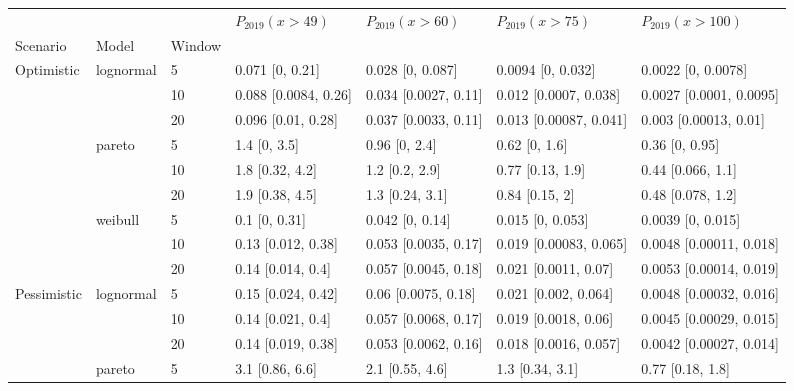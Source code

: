 \begin{tabular}{lllllll}
\toprule
           &         &    &      $P_{2019}(x>49)$ &      $P_{2019}(x>60)$ &        $P_{2019}(x>75)$ &        $P_{2019}(x>100)$ \\
Scenario & Model & Window &                       &                       &                         &                          \\
\midrule
Optimistic & lognormal & 5  &       0.071 [0, 0.21] &      0.028 [0, 0.087] &       0.0094 [0, 0.032] &       0.0022 [0, 0.0078] \\
           &         & 10 &  0.088 [0.0084, 0.26] &  0.034 [0.0027, 0.11] &   0.012 [0.0007, 0.038] &  0.0027 [0.0001, 0.0095] \\
           &         & 20 &    0.096 [0.01, 0.28] &  0.037 [0.0033, 0.11] &  0.013 [0.00087, 0.041] &    0.003 [0.00013, 0.01] \\
           & pareto & 5  &          1.4 [0, 3.5] &         0.96 [0, 2.4] &           0.62 [0, 1.6] &           0.36 [0, 0.95] \\
           &         & 10 &       1.8 [0.32, 4.2] &        1.2 [0.2, 2.9] &        0.77 [0.13, 1.9] &        0.44 [0.066, 1.1] \\
           &         & 20 &       1.9 [0.38, 4.5] &       1.3 [0.24, 3.1] &          0.84 [0.15, 2] &        0.48 [0.078, 1.2] \\
           & weibull & 5  &         0.1 [0, 0.31] &       0.042 [0, 0.14] &        0.015 [0, 0.053] &        0.0039 [0, 0.015] \\
           &         & 10 &    0.13 [0.012, 0.38] &  0.053 [0.0035, 0.17] &  0.019 [0.00083, 0.065] &  0.0048 [0.00011, 0.018] \\
           &         & 20 &     0.14 [0.014, 0.4] &  0.057 [0.0045, 0.18] &    0.021 [0.0011, 0.07] &  0.0053 [0.00014, 0.019] \\
Pessimistic & lognormal & 5  &    0.15 [0.024, 0.42] &   0.06 [0.0075, 0.18] &    0.021 [0.002, 0.064] &  0.0048 [0.00032, 0.016] \\
           &         & 10 &     0.14 [0.021, 0.4] &  0.057 [0.0068, 0.17] &    0.019 [0.0018, 0.06] &  0.0045 [0.00029, 0.015] \\
           &         & 20 &    0.14 [0.019, 0.38] &  0.053 [0.0062, 0.16] &   0.018 [0.0016, 0.057] &  0.0042 [0.00027, 0.014] \\
           & pareto & 5  &       3.1 [0.86, 6.6] &       2.1 [0.55, 4.6] &         1.3 [0.34, 3.1] &         0.77 [0.18, 1.8] \\

\end{tabular}
